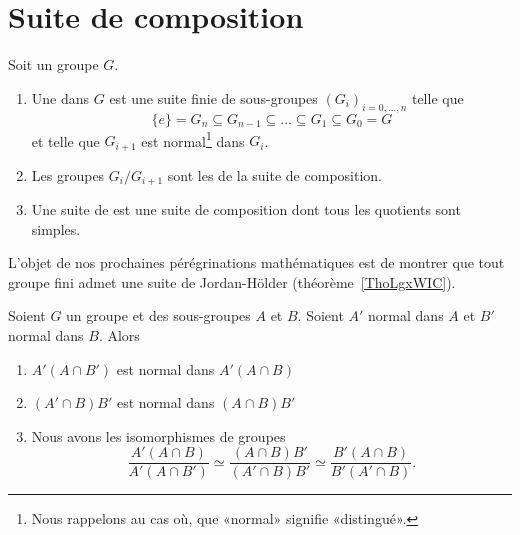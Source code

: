 \section{Suite de composition}


\begin{definition}  \label{DefJWZSooNcntfK}
    Soit un groupe \( G\).
	\begin{enumerate}
		\item
		      Une  dans \( G\) est une suite finie de sous-groupes \( (G_i)_{i=0,\ldots, n}\) telle que
		      \begin{equation}
				  \{ e \}=G_n\subseteq G_{n-1}\subseteq\ldots\subseteq G_1\subseteq G_0=G
		      \end{equation}
		      et telle que \( G_{i+1}\) est normal\footnote{Nous rappelons au cas où, que «normal» signifie «distingué».} dans \( G_i\).
          \item
              Les groupes \( G_i/G_{i+1}\) sont les  de la suite de composition.
		\item
		      Une suite de  est une suite de composition dont tous les quotients sont simples.
	\end{enumerate}
\end{definition}
L'objet de nos prochaines pérégrinations mathématiques est de montrer que tout groupe fini admet une suite de Jordan-Hölder (théorème~\ref{ThoLgxWIC}).

\begin{lemma}\label{LemsKpXCG}
	Soient \( G\) un groupe et des sous-groupes \( A\) et \( B\). Soient \( A'\) normal dans \( A\) et \( B'\) normal dans \( B\). Alors
	\begin{enumerate}
		\item
		      \( A'(A\cap B')\) est normal dans \( A'(A\cap B)\)
		\item
		      \( (A'\cap B)B'\) est normal dans \( (A\cap B)B'\)
		\item
		      Nous avons les isomorphismes de groupes
		      \begin{equation}
			      \frac{ A'(A\cap B) }{ A'(A\cap B') }\simeq\frac{ (A\cap B)B' }{ (A'\cap B)B' }\simeq\frac{ B'(A\cap B) }{ B'(A'\cap B) }.
		      \end{equation}
	\end{enumerate}
\end{lemma}

